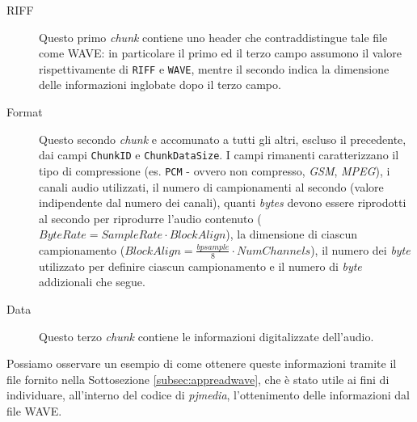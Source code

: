 \begin{description}
\item[RIFF] Questo primo \textit{chunk} contiene uno header che contraddistingue
	tale file come WAVE: in particolare il primo ed il terzo campo assumono
	il valore rispettivamente di \texttt{\small RIFF} e \texttt{\small WAVE}, mentre
	il secondo indica la dimensione delle informazioni inglobate dopo il terzo
	campo.
\item[Format] Questo secondo \textit{chunk} e accomunato a tutti gli altri, escluso
	il precedente, dai campi \texttt{\small ChunkID} e \texttt{\small ChunkDataSize}.
	I campi rimanenti caratterizzano il tipo di compressione (es. \texttt{PCM} - ovvero
	non compresso, \textit{GSM}, \textit{MPEG}), i canali audio utilizzati, il numero
	di campionamenti al secondo (valore indipendente dal numero
	dei canali), quanti \textit{bytes} devono essere riprodotti al secondo per 
	riprodurre l'audio contenuto ($ByteRate = SampleRate \cdot BlockAlign$),
	la dimensione di ciascun campionamento ($BlockAlign = \frac{bpsample}{8} \cdot NumChannels$),
	il numero dei \textit{byte} utilizzato per definire ciascun campionamento e 
	il numero di \textit{byte} addizionali che segue.
\item[Data] Questo terzo  \textit{chunk} contiene le informazioni digitalizzate dell'audio.
\end{description}

Possiamo osservare un esempio di come ottenere queste informazioni tramite il
file fornito nella Sottosezione \vref{subsec:appreadwave}, che è stato utile
ai fini di individuare, all'interno del codice di \textit{pjmedia}, l'ottenimento
delle informazioni dal file WAVE.




